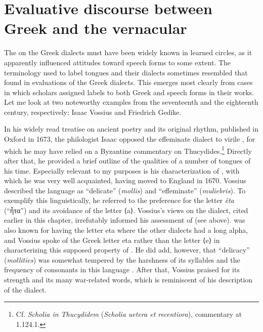 \section{Evaluative discourse between Greek and the vernacular}\label{sec:7.3}


The  on the Greek dialects must have been widely known in learned circles, as it apparently influenced attitudes toward  speech forms to some extent. The terminology used to label  tongues and their dialects sometimes resembled that found in evaluations of the Greek dialects. This emerges most clearly from cases in which scholars assigned labels to both Greek and  speech forms in their works. Let me look at two noteworthy examples from the seventeenth and the eighteenth century, respectively: Isaac Vossius and Friedrich Gedike.

In his widely read treatise on ancient poetry and its original rhythm, published in Oxford in 1673, the  philologist Isaac \citet[54--55]{Vossius1673} opposed the effeminate  dialect to virile , for which he may have relied on a Byzantine commentary on Thucydides.\footnote{Cf. \textit{Scholia in Thucydidem} (\textit{Scholia uetera et recentiora}), commentary at 1.124.1.} Directly after that, he provided a brief outline of the qualities of a number of  tongues of his time. Especially relevant to my purposes is his characterization of , with which he was very well acquainted, having moved to England in 1670. Vossius described the language as “delicate” (\textit{mollis}) and “effeminate” (\textit{muliebris}). To exemplify this linguistically, he referred to the  preference for the letter \textit{êta} (“ἦτα”) and its avoidance of the letter ⟨a⟩. Vossius’s views on the  dialect, cited earlier in this chapter, irrefutably informed his assessment of  (see  above).  was also known for having the letter eta where the other dialects had a long alpha, and Vossius spoke of the Greek letter eta rather than the  letter ⟨e⟩ in characterizing this supposed property of . He did add, however, that  “delicacy” (\textit{mollities}) was somewhat tempered by the harshness of its syllables and the frequency of consonants in this language \citep[56]{Vossius1673}. After that, Vossius praised  for its strength and its many war-related words, which is reminiscent of his description of the  dialect.

